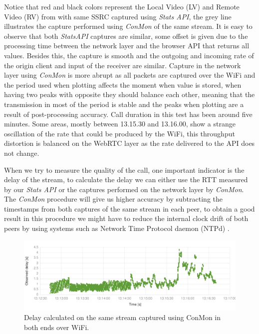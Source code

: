 Notice that red and black colors represent the Local Video (LV) and Remote Video (RV) from with same SSRC captured using {\it Stats API}, the grey line illustrates the capture performed using {\it ConMon} of the same stream. It is easy to observe that both {\it StatsAPI} captures are similar, some offset is given due to the processing time between the network layer and the browser API that returns all values. Besides this, the capture is smooth and the outgoing and incoming rate of the origin client and input of the receiver are similar. Capture in the network layer using {\it ConMon} is more abrupt as all packets are captured over the WiFi and the period used when plotting affects the moment when value is stored, when having two peaks with opposite they should balance each other, meaning that the transmission in most of the period is stable and the peaks when plotting are a result of post-processing accuracy. Call duration in this test has been around five minutes. Some areas, mostly between 13.15.30 and 13.16.00, show a strange oscillation of the rate that could be produced by the WiFi, this throughput distortion is balanced on the WebRTC layer as the rate delivered to the API does not change.

When we try to measure the quality of the call, one important indicator is the delay of the stream, to calculate the delay we can either use the RTT measured by our {\it Stats API} or the captures performed on the network layer by {\it ConMon}. The {\it ConMon} procedure will give us higher accuracy by subtracting the timestamps from both captures of the same stream in each peer, to obtain a good result in this procedure we might have to reduce the internal clock drift of both peers by using systems such as Network Time Protocol daemon (NTPd) .

 \begin{figure}[h]
  \centering
    \includegraphics[width=1\textwidth]{./figures/delay_116_646227.pdf}
      \caption[Delay calculated on the same stream captured using ConMon in both ends over WiFi]{Delay calculated on the same stream captured using ConMon in both ends over WiFi.}
	\label{fig:delay_116_646227}
\end{figure}

